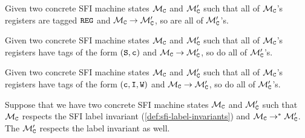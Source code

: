 \documentclass[12pt]{amsart}
\begin{document}
\begin{lemma}\label{lem:sfi-register-labels}
  Given two concrete SFI machine states $\mathcal{M}_{\mathtt{C}}$ and $\mathcal{M}_{\mathtt{C}}'$ such that
  all of $\mathcal{M}_{\mathtt{C}}$'s registers are tagged $\mathtt{REG}$ and $\mathcal{M}_{\mathtt{C}} \to
  \mathcal{M}_{\mathtt{C}}'$, so are all of $\mathcal{M}_{\mathtt{C}}'$'s.
\end{lemma}

\begin{lemma}\label{lem:sfi-pc-label}
  Given two concrete SFI machine states $\mathcal{M}_{\mathtt{C}}$ and $\mathcal{M}_{\mathtt{C}}'$ such that
  all of $\mathcal{M}_{\mathtt{C}}$'s registers have tags of the form
  $(\mathtt{S},\mathtt{c})$ and $\mathcal{M}_{\mathtt{C}} \to \mathcal{M}_{\mathtt{C}}'$, so do all of
  $\mathcal{M}_{\mathtt{C}}'$'s.
\end{lemma}

\begin{lemma}\label{lem:sfi-memory-labels}
  Given two concrete SFI machine states $\mathcal{M}_{\mathtt{C}}$ and $\mathcal{M}_{\mathtt{C}}'$ such that
  all of $\mathcal{M}_{\mathtt{C}}$'s registers have tags of the form
  $(\mathtt{c},\mathtt{I},\mathtt{W})$ and $\mathcal{M}_{\mathtt{C}} \to \mathcal{M}_{\mathtt{C}}'$, so
  do all of $\mathcal{M}_{\mathtt{C}}'$'s.
\end{lemma}

\begin{theorem}
\label{thm:sfi-label-invariant-maintained}
  Suppose that we have two concrete SFI machine states $\mathcal{M}_{\mathtt{C}}$ and
  $\mathcal{M}_{\mathtt{C}}'$ such that $\mathcal{M}_{\mathtt{C}}$ respects the SFI label invariant
  (\cref{def:sfi-label-invariants}) and $\mathcal{M}_{\mathtt{C}} \to^* \mathcal{M}_{\mathtt{C}}'$.  The
  $\mathcal{M}_{\mathtt{C}}'$ respects the label invariant as well.
\end{theorem}
\end{document}
